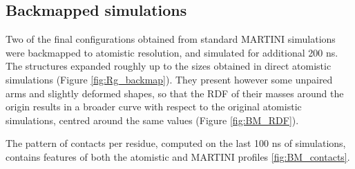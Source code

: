 \subsection{Backmapped simulations} 

Two of the final configurations obtained from standard MARTINI simulations were backmapped to atomistic resolution, and simulated for additional 200 ns. The structures expanded roughly up to the sizes obtained in direct atomistic simulations (Figure \ref{fig:Rg_backmap}). They present however some unpaired arms and slightly deformed shapes, so that the RDF of their masses around the origin results in a broader curve with respect to the original atomistic simulations, centred around the same values (Figure \ref{fig:BM_RDF}).

The pattern of contacts per residue, computed on the last 100 ns of simulations, contains features of both the atomistic and MARTINI profiles \ref{fig:BM_contacts}.
%
